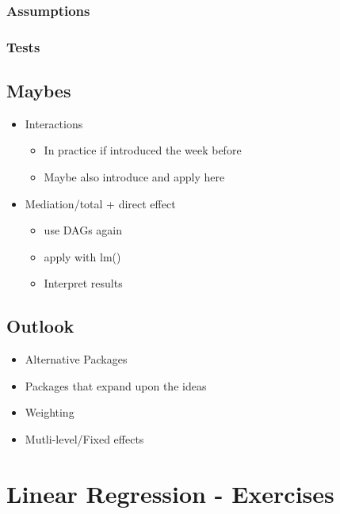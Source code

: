 \documentclass[
]{book}
\providecommand{\tightlist}{%
  \setlength{\itemsep}{0pt}\setlength{\parskip}{0pt}}
\begin{document}
\hypertarget{assumptions}{%
\subsection{Assumptions}\label{assumptions}}

\hypertarget{tests}{%
\subsection{Tests}\label{tests}}

\hypertarget{maybes-2}{%
\section{Maybes}\label{maybes-2}}

\begin{itemize}
\tightlist
\item
  Interactions

  \begin{itemize}
  \tightlist
  \item
    In practice if introduced the week before
  \item
    Maybe also introduce and apply here
  \end{itemize}
\item
  Mediation/total + direct effect

  \begin{itemize}
  \tightlist
  \item
    use DAGs again
  \item
    apply with lm()
  \item
    Interpret results
  \end{itemize}
\end{itemize}

\hypertarget{outlook}{%
\section{Outlook}\label{outlook}}

\begin{itemize}
\tightlist
\item
  Alternative Packages
\item
  Packages that expand upon the ideas
\item
  Weighting
\item
  Mutli-level/Fixed effects
\end{itemize}

\hypertarget{lin-e}{%
\chapter{Linear Regression - Exercises}\label{lin-e}}
\end{document}
